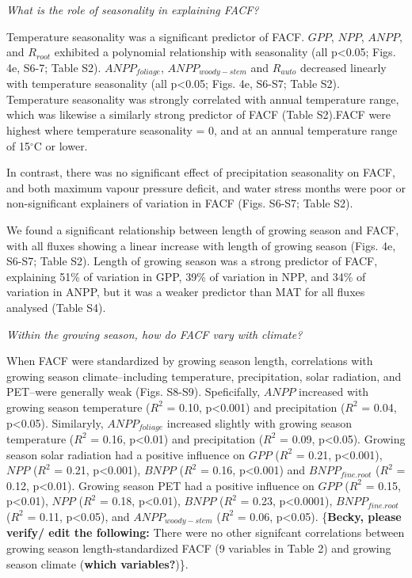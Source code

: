 \documentclass[]{article}
\begin{document}
\emph{What is the role of seasonality in explaining FACF?}

Temperature seasonality was a significant predictor of FACF. \(GPP\),
\(NPP\), \(ANPP\), and \(R_{root}\) exhibited a polynomial relationship
with seasonality (all p\textless{}0.05; Figs. 4e, S6-7; Table S2).
\(ANPP_{foliage}\), \(ANPP_{woody-stem}\) and \(R_{auto}\) decreased
linearly with temperature seasonality (all p\textless{}0.05; Figs. 4e,
S6-S7; Table S2). Temperature seasonality was strongly correlated with
annual temperature range, which was likewise a similarly strong
predictor of FACF (Table S2).FACF were highest where temperature
seasonality = 0, and at an annual temperature range of 15\(^\circ\)C or
lower.

In contrast, there was no significant effect of precipitation
seasonality on FACF, and both maximum vapour pressure deficit, and water
stress months were poor or non-significant explainers of variation in
FACF (Figs. S6-S7; Table S2).

We found a significant relationship between length of growing season and
FACF, with all fluxes showing a linear increase with length of growing
season (Figs. 4e, S6-S7; Table S2). Length of growing season was a
strong predictor of FACF, explaining 51\% of variation in GPP, 39\% of
variation in NPP, and 34\% of variation in ANPP, but it was a weaker
predictor than MAT for all fluxes analysed (Table S4).

\emph{Within the growing season, how do FACF vary with climate?}

When FACF were standardized by growing season length, correlations with
growing season climate--including temperature, precipitation, solar
radiation, and PET--were generally weak (Figs. S8-S9). Speficifally,
\(ANPP\) increased with growing season temperature (\(R^2\) = 0.10,
p\textless{}0.001) and precipitation (\(R^2\) = 0.04, p\textless{}0.05).
Similaryly, \(ANPP_{foliage}\) increased slightly with growing season
temperature (\(R^2\) = 0.16, p\textless{}0.01) and precipitation
(\(R^2\) = 0.09, p\textless{}0.05). Growing season solar radiation had a
positive influence on \(GPP\) (\(R^2\) = 0.21, p\textless{}0.001),
\(NPP\) (\(R^2\) = 0.21, p\textless{}0.001), \(BNPP\) (\(R^2\) = 0.16,
p\textless{}0.001) and \(BNPP_{fine.root}\) (\(R^2\) = 0.12,
p\textless{}0.01). Growing season PET had a positive influence on
\(GPP\) (\(R^2\) = 0.15, p\textless{}0.01), \(NPP\) (\(R^2\) = 0.18,
p\textless{}0.01), \(BNPP\) (\(R^2\) = 0.23, p\textless{}0.0001),
\(BNPP_{fine.root}\) (\(R^2\) = 0.11, p\textless{}0.05), and
\(ANPP_{woody-stem}\) (\(R^2\) = 0.06, p\textless{}0.05).
\{\textbf{Becky, please verify/ edit the following:} There were no other
signifcant correlations between growing season length-standardized FACF
(9 variables in Table 2) and growing season climate (\textbf{which
variables?})\}.
\end{document}
